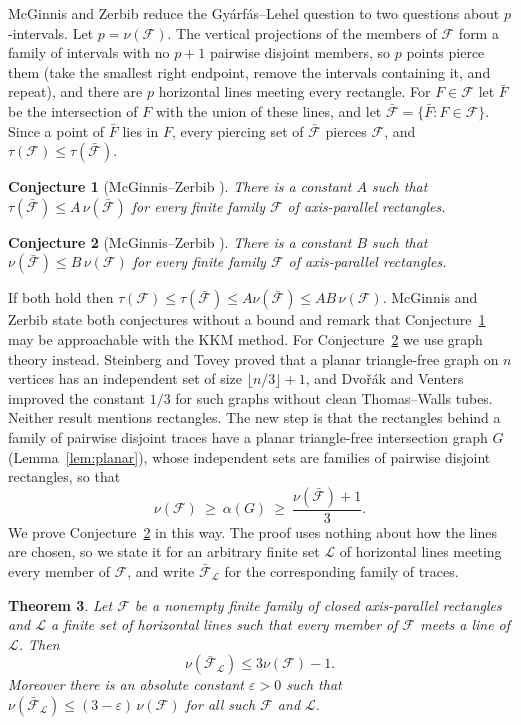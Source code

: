 \documentclass[11pt]{article}
\newtheorem{theorem}{Theorem}
\newtheorem{conjecture}[theorem]{Conjecture}
\theoremstyle{remark}
\newcommand{\F}{\mathcal{F}}
\newcommand{\Fb}{\bar{\mathcal{F}}}
\newcommand{\cL}{\mathcal{L}}
\begin{document}
McGinnis and Zerbib \cite[Section~3.3]{MZ} reduce the Gy\'arf\'as--Lehel question to two questions about $p$-intervals. Let $p=\nu(\F)$. The vertical projections of the members of $\F$ form a family of intervals with no $p+1$ pairwise disjoint members, so $p$ points pierce them (take the smallest right endpoint, remove the intervals containing it, and repeat), and there are $p$ horizontal lines meeting every rectangle. For $F\in\F$ let $\bar F$ be the intersection of $F$ with the union of these lines, and let $\Fb=\{\bar F: F\in\F\}$. Since a point of $\bar F$ lies in $F$, every piercing set of $\Fb$ pierces $\F$, and $\tau(\F)\le\tau(\Fb)$.

\begin{conjecture}[McGinnis--Zerbib {\cite[Conjecture~3.7]{MZ}}]\label{conj:A}
There is a constant $A$ such that $\tau(\Fb)\le A\,\nu(\Fb)$ for every finite family $\F$ of axis-parallel rectangles.
\end{conjecture}

\begin{conjecture}[McGinnis--Zerbib {\cite[Conjecture~3.8]{MZ}}]\label{conj:B}
There is a constant $B$ such that $\nu(\Fb)\le B\,\nu(\F)$ for every finite family $\F$ of axis-parallel rectangles.
\end{conjecture}

If both hold then $\tau(\F)\le\tau(\Fb)\le A\nu(\Fb)\le AB\,\nu(\F)$. McGinnis and Zerbib state both conjectures without a bound and remark that Conjecture~\ref{conj:A} may be approachable with the KKM method. For Conjecture~\ref{conj:B} we use graph theory instead. Steinberg and Tovey \cite{ST} proved that a planar triangle-free graph on $n$ vertices has an independent set of size $\lfloor n/3\rfloor+1$, and Dvo\v{r}\'ak and Venters \cite[Theorem~2]{DV} improved the constant $1/3$ for such graphs without clean Thomas--Walls tubes. Neither result mentions rectangles. The new step is that the rectangles behind a family of pairwise disjoint traces have a planar triangle-free intersection graph $G$ (Lemma~\ref{lem:planar}), whose independent sets are families of pairwise disjoint rectangles, so that
\[
\nu(\F)\ \ge\ \alpha(G)\ \ge\ \frac{\nu(\Fb)+1}{3}.
\]
We prove Conjecture~\ref{conj:B} in this way. The proof uses nothing about how the lines are chosen, so we state it for an arbitrary finite set $\cL$ of horizontal lines meeting every member of $\F$, and write $\Fb_\cL$ for the corresponding family of traces.

\begin{theorem}\label{thm:main}
Let $\F$ be a nonempty finite family of closed axis-parallel rectangles and $\cL$ a finite set of horizontal lines such that every member of $\F$ meets a line of $\cL$. Then
\[
\nu(\Fb_\cL)\le 3\nu(\F)-1 .
\]
Moreover there is an absolute constant $\varepsilon>0$ such that $\nu(\Fb_\cL)\le(3-\varepsilon)\,\nu(\F)$ for all such $\F$ and $\cL$.
\end{theorem}
\end{document}
